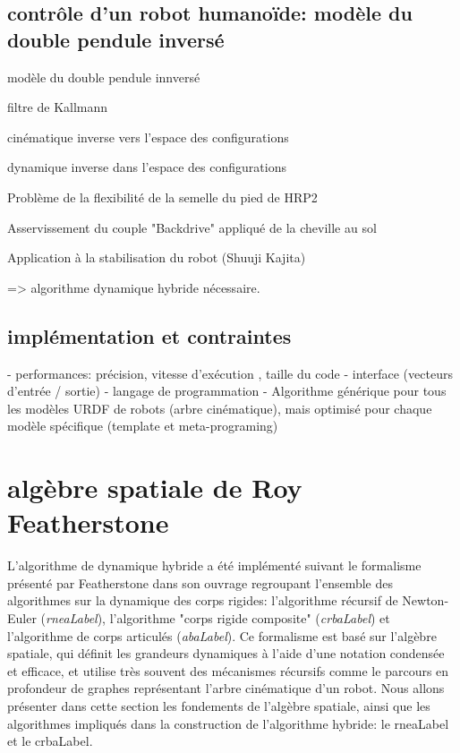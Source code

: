 \documentclass{report}
\begin{document}
\section{contrôle d'un robot humanoïde: modèle du double pendule inversé}

modèle du double pendule innversé

filtre de Kallmann

cinématique inverse vers l'espace des configurations

dynamique inverse dans l'espace des configurations

Problème de la flexibilité de la semelle du pied de HRP2

Asservissement du couple "Backdrive" appliqué de la cheville au sol

Application à la stabilisation du robot (Shuuji Kajita)

=> algorithme dynamique hybride nécessaire.

\section{implémentation et contraintes}
- performances: précision, vitesse d'exécution , taille du code\vspace{0.3cm}
- interface (vecteurs d'entrée / sortie)\vspace{0.3cm}
- langage de programmation\vspace{0.3cm}
- Algorithme générique pour tous les modèles URDF de robots (arbre cinématique), mais optimisé pour chaque modèle spécifique (template et meta-programing)\vspace{0.3cm}



\chapter{algèbre spatiale de Roy Featherstone}
L'algorithme de dynamique hybride a été implémenté suivant le formalisme présenté par Featherstone dans son ouvrage \cite{Featherstone} regroupant l'ensemble des algorithmes sur la dynamique des corps rigides: l'algorithme récursif de Newton-Euler (\emph{\gls{rneaLabel}}), l'algorithme "corps rigide composite" (\emph{\gls{crbaLabel}}) et l'algorithme de corps articulés (\emph{\gls{abaLabel}}). Ce formalisme est basé sur l'algèbre spatiale, qui définit les grandeurs dynamiques à l'aide d'une notation condensée et efficace, et utilise très souvent des mécanismes récursifs comme le parcours en profondeur de graphes représentant l'arbre cinématique d'un robot. Nous allons présenter dans cette section les fondements de l'algèbre spatiale, ainsi que les algorithmes impliqués dans la construction de l'algorithme hybride: le \gls{rneaLabel} et le \gls{crbaLabel}.\\
\end{document}
